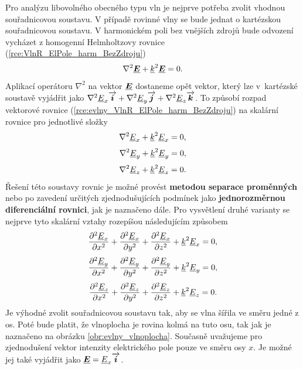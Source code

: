 Pro analýzu libovolného obecného typu vln je nejprve potřeba zvolit vhodnou souřadnicovou soustavu. V případě rovinné vlny se bude jednat o kartézskou souřadnicovou soustavu. V harmonickém poli bez vnějších zdrojů bude odvození vycházet z homogenní Helmholtzovy rovnice (\ref{rce:VlnR_ElPole_harm_BezZdroju})
\begin{equation}
	\nabla^{2}\mbox{\underline{\boldmath$E$}} + {\underline{k}}^{2}\mbox{\underline{\boldmath$E$}} = 0.
	\label{rce:evlny_VlnR_ElPole_harm_BezZdroju}
\end{equation}
Aplikací operátoru $\nabla^{2}$ na vektor $\mbox{\underline{\boldmath$E$}}$ dostaneme opět vektor, který lze v~kartézské soustavě vyjádřit jako $\nabla^{2}{\underline{E}}_{x}\overrightarrow{\mbox{\boldmath$i$}} + \nabla^{2} {\underline{E}}_{y}\overrightarrow{\mbox{\boldmath$j$}} + \nabla^{2}{\underline{E}}_{z}\overrightarrow{\mbox{\boldmath$k$}}$. To způsobí rozpad vektorové rovnice (\ref{rce:evlny_VlnR_ElPole_harm_BezZdroju}) na skalární rovnice pro jednotlivé složky
\begin{displaymath}
	\nabla^{2} {\underline{E}}_{x} +{\underline{k}}^{2} {\underline{E}}_{x} = 0,
\end{displaymath}
\begin{displaymath}
	\nabla^{2} {\underline{E}}_{y} +{\underline{k}}^{2} {\underline{E}}_{y} = 0,
\end{displaymath}
\begin{displaymath}
	\nabla^{2} {\underline{E}}_{z} +{\underline{k}}^{2} {\underline{E}}_{z} = 0.
\end{displaymath}
Řešení této soustavy rovnic je možné provést {\bf metodou separace proměnných} nebo po zavedení určitých zjednodušujících podmínek jako {\bf jednorozměrnou diferenciální rovnici}, jak je naznačeno dále. Pro vysvětlení druhé varianty se nejprve tyto skalární vztahy rozepíšou následujícím způsobem
\begin{equation}
	\frac{\partial ^{2} {\underline{E}}_{x}}{\partial x^{2}} + \frac{\partial ^{2}{\underline{E}}_{x}}{\partial y^{2}} + \frac{\partial ^{2}{\underline{E}}_{x}}{\partial z^{2}} + {\underline{k}}^{2} {\underline{E}}_{x} = 0,
	\label{rce:evlny_skalarni1}
\end{equation}
\begin{equation}
	\frac{\partial ^{2} {\underline{E}}_{y}}{\partial x^{2}} + \frac{\partial ^{2} {\underline{E}}_{y}}{\partial y^{2}} + \frac{\partial ^{2} {\underline{E}}_{y}}{\partial z^{2}} + {\underline{k}}^{2} {\underline{E}}_{y} = 0,
	\label{rce:evlny_skalarni2}
\end{equation}
\begin{equation}
	\frac{\partial ^{2} {\underline{E}}_{z}}{\partial x^{2}} + \frac{\partial ^{2} {\underline{E}}_{z}}{\partial y^{2}} + \frac{\partial ^{2} {\underline{E}}_{z}}{\partial z^{2}} + {\underline{k}}^{2} {\underline{E}}_{z} = 0.
	\label{rce:evlny_skalarni3}	
\end{equation}
Je výhodné zvolit souřadnicovou soustavu tak, aby se vlna šířila ve směru jedné z os. Poté bude platit, že vlnoplocha je rovina kolmá na tuto osu, tak jak je naznačeno na obrázku \ref{obr:evlny_vlnoplocha}. Současně uvažujeme pro zjednodušení vektor intenzity elektrického pole pouze ve směru osy $x$. Je možné jej také vyjádřit jako $\mbox{\underline{\boldmath$E$}} = {\underline{E}}_{x}\overrightarrow{\mbox{\boldmath$i$}}$.

